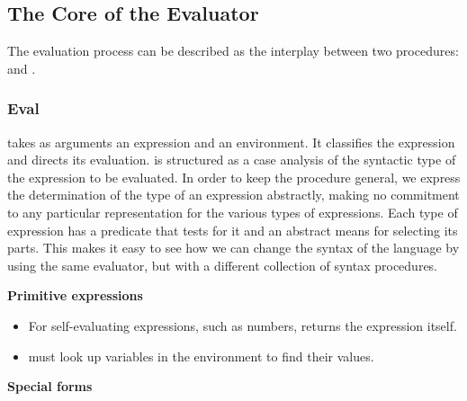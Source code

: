 \subsection{The Core of the Evaluator}
\label{Section 4.1.1}

The evaluation process can be described as the interplay between two
procedures:  and .

\subsubsection*{Eval}

 takes as arguments an expression and an environment.  It classifies
the expression and directs its evaluation.   is structured as a case
analysis of the syntactic type of the expression to be evaluated.  In order to
keep the procedure general, we express the determination of the type of an
expression abstractly, making no commitment to any particular representation
for the various types of expressions.  Each type of expression has a predicate
that tests for it and an abstract means for selecting its parts.  This
 makes it easy to see how we can change the syntax of
the language by using the same evaluator, but with a different collection of
syntax procedures.

\bigskip
\noindent
\textbf{Primitive expressions}

\begin{itemize}

\item
For self-evaluating expressions, such as numbers,  returns the
expression itself.

\item
{} must look up variables in the environment to find their values.

\end{itemize}

\noindent
\textbf{Special forms}

